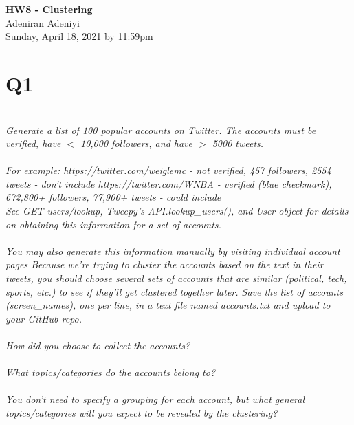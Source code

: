 \documentclass[12pt]{article}
\begin{document}
\begin{centering}
{\large\textbf{HW8 - Clustering}}\\ %
Adeniran Adeniyi\\                     %
Sunday, April 18, 2021 by 11:59pm\\                      %
\end{centering}



\section*{Q1}
\emph{
\\Generate a list of 100 popular accounts on Twitter. The accounts must be verified, have $<$ 10,000 followers, and have $>$ 5000 tweets.
\\ \\ For example:
https://twitter.com/weiglemc - not verified, 457 followers, 2554 tweets - don't include
https://twitter.com/WNBA - verified (blue checkmark), 672,800+ followers, 77,900+ tweets - could include \\See GET users/lookup, Tweepy's API.lookup\_users(), and User object for details on obtaining this information for a set of accounts.\\ \\
You may also generate this information manually by visiting individual account pages
Because we're trying to cluster the accounts based on the text in their tweets, you should choose several sets of accounts that are similar (political, tech, sports, etc.) to see if they'll get clustered together later.
Save the list of accounts (screen\_names), one per line, in a text file named accounts.txt and upload to your GitHub repo.\\ \\
How did you choose to collect the accounts?\\ \\
What topics/categories do the accounts belong to? \\ \\ You don't need to specify a grouping for each account, but what general topics/categories will you expect to be revealed by the clustering?}
\end{document}
